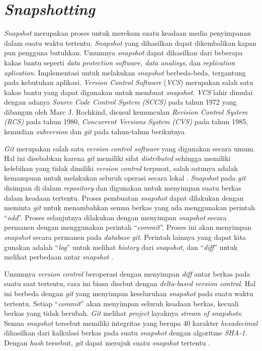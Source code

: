 \section{\emph{Snapshotting}}

\emph{Snapshot} merupakan proses untuk merekam suatu keadaan media
penyimpanan dalam suatu waktu tertentu. \emph{Snapshot} yang
dihasilkan dapat dikembalikan kapan pun pengguna butuhkan. Umumnya
\emph{snapshot} dapat dihasilkan dari beberapa kakas bantu seperti
\emph{data protection software, data analisys}, dan \emph{replication
  aplication}. Implementasi untuk melakukan \emph{snapshot}
berbeda-beda, tergantung pada kebutuhan aplikasi\parencite{garimella}.
\emph{Version Control Software} (\emph{VCS})
merupakan salah satu kakas bantu yang dapat digunakan untuk membuat
\emph{snapshot}. \emph{VCS} lahir dimulai dengan adanya \emph{Source Code Control System (SCCS)}
pada tahun 1972 yang dibangun oleh Marc J. Rochkind, disusul
kemunculan \emph{Revision Control System (RCS)} pada tahun 1980,
\emph{Concurrent Versions System (CVS)} pada tahun 1985,
kemudian \emph{subversion} dan \emph{git} pada tahun-tahun berikutnya
\parencite{ruparelia2010history}

\emph{Git} merupakan salah satu \emph{version control software} yang digunakan
secara umum. Hal ini disebabkan karena \emph{git} memiliki sifat
\emph{distributed} sehingga memiliki kelebihan yang tidak dimiliki
\emph{version control} terpusat, salah satunya adalah kemampuan untuk
melakukan seluruh operasi secara lokal \parencite{ruparelia2010history}.
\emph{Snapshot} pada \emph{git} disimpan di dalam \emph{repository} dan digunakan
untuk menyimpan suatu berkas dalam keadaan tertentu. Proses pembuatan \emph{snapshot} dapat
dilakukan dengan meminta \emph{git} untuk menambahkan semua
berkas yang ada menggunakan perintah ``\emph{add}''. Proses selanjutnya dilakukan dengan
menyimpan \emph{snapshot} secara permanen dengan menggunakan perintah
``\emph{commit}''. Proses ini akan menyimpan \emph{snapshot}
secara permanen pada \emph{database} \emph{git}.  Perintah lainnya yang dapat
kita gunakan adalah ``\emph{log}'' untuk melihat \emph{history} dari
\emph{snapshot}, dan ``\emph{diff}'' untuk melihat perbedaan antar
\emph{snapshot} \parencite{chacon2014pro}.

Umumnya \emph{version control} beroperasi dengan menyimpan \emph{diff}
antar berkas pada suatu saat tertentu, cara ini biasa disebut dengan
\emph{delta-based version control}. Hal ini berbeda dengan \emph{git} yang menyimpan
keseluruhan \emph{snapshot} pada suatu waktu tertentu. Setiap
``\emph{commit}'' akan menyimpan seluruh keadaan berkas, kecuali
berkas yang tidak berubah. \emph{Git} melihat \emph{project} layaknya
\emph{stream of snapshots}. Semua \emph{snapshot} tersebut memiliki
integritas yang berupa 40 karakter \emph{hexadecimal} dihasilkan dari
kalkulasi berkas pada suatu \emph{snapshot} dengan algoritme
\emph{SHA-1}. Dengan \emph{hash} tersebut, \emph{git} dapat merujuk
suatu \emph{snapshot} tertentu \parencite{chacon2014pro}.


